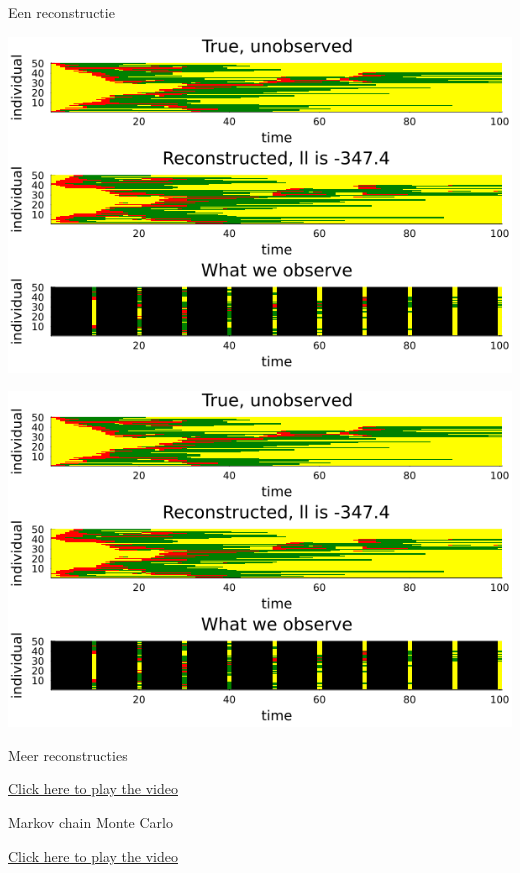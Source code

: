 \documentclass[aspectratio=169,xcolor=dvipsnames]{beamer}
\begin{document}
\begin{frame}{Een reconstructie}	

\begin{center}
\includegraphics[scale=0.5]{large_example_forward_guided.png}	
\end{center}

\includegraphics[scale=0.5]{large_example_forward_guided.png}
	
\end{frame}


\begin{frame}{Meer reconstructies}


 \href{run:multipleguided.mp4}{Click here to play the video}
	
\end{frame}



\begin{frame}{Markov chain Monte Carlo}


 \href{run:mcmc_guided.mp4}{Click here to play the video}
	
\end{frame}
\end{document}
